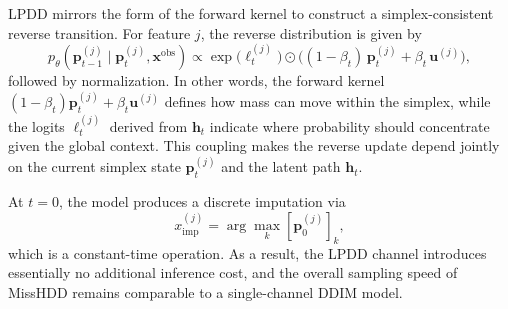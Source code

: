 \documentclass[times, review, 10pt]{elsarticle}
\begin{document}
LPDD mirrors the form of the forward kernel to construct a
simplex-consistent reverse transition. For feature $j$, the reverse
distribution is given by
\begin{equation}
p_\theta(\mathbf{p}_{t-1}^{(j)} \mid \mathbf{p}_t^{(j)}, \mathbf{x}^{\mathrm{obs}})
\propto
\exp\!\big(\boldsymbol{\ell}_t^{(j)}\big)
\odot
\Big((1-\beta_t)\,\mathbf{p}_t^{(j)} + \beta_t\,\mathbf{u}^{(j)}\Big),
\end{equation}
followed by normalization. In other words, the forward kernel
\((1-\beta_t)\mathbf{p}_t^{(j)} + \beta_t\mathbf{u}^{(j)}\) defines how mass
can move within the simplex, while the logits $\boldsymbol{\ell}_t^{(j)}$
derived from $\mathbf{h}_t$ indicate where probability should
concentrate given the global context. This coupling makes the reverse update
depend jointly on the current simplex state $\mathbf{p}_t^{(j)}$ and the
latent path $\mathbf{h}_t$.

At $t=0$, the model produces a discrete imputation via
\[
x^{(j)}_{\text{imp}} = \arg\max_k [\mathbf{p}_0^{(j)}]_k,
\]
which is a constant-time operation. As a result, the LPDD channel introduces
essentially no additional inference cost, and the overall sampling speed of
MissHDD remains comparable to a single-channel DDIM model.








\end{document}
